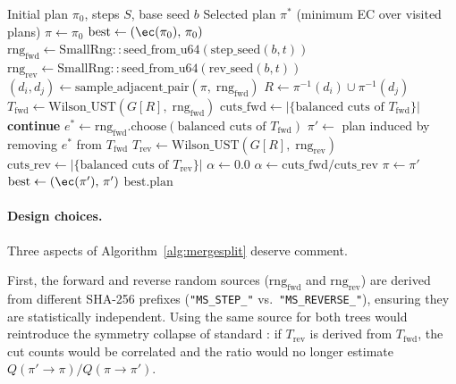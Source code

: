 \begin{algorithm}
\caption{\mergesplit{} Chain}
\label{alg:mergesplit}
\begin{algorithmic}[1]
\Require Initial plan $\pi_0$, steps $S$, base seed $b$
\Ensure  Selected plan $\pi^*$ (minimum EC over visited plans)
\State $\pi \gets \pi_0$
\State $\mathrm{best} \gets (\ec(\pi_0),\, \pi_0)$
  \State $\mathrm{rng}_{\mathrm{fwd}} \gets \mathrm{SmallRng::seed\_from\_u64}(\mathrm{step\_seed}(b, t))$
  \State $\mathrm{rng}_{\mathrm{rev}} \gets \mathrm{SmallRng::seed\_from\_u64}(\mathrm{rev\_seed}(b, t))$
  \State $(d_i, d_j) \gets \mathrm{sample\_adjacent\_pair}(\pi,\; \mathrm{rng}_{\mathrm{fwd}})$
  \State $R \gets \pi^{-1}(d_i) \cup \pi^{-1}(d_j)$
  \State $T_{\mathrm{fwd}} \gets \mathrm{Wilson\_UST}(G[R],\; \mathrm{rng}_{\mathrm{fwd}})$
  \State $\mathrm{cuts\_fwd} \gets |\{\text{balanced cuts of } T_{\mathrm{fwd}}\}|$
   \textbf{continue} \EndIf
  \State $e^* \gets \mathrm{rng}_{\mathrm{fwd}}.\mathrm{choose}(\text{balanced cuts of } T_{\mathrm{fwd}})$
  \State $\pi' \gets$ plan induced by removing $e^*$ from $T_{\mathrm{fwd}}$
  \State $T_{\mathrm{rev}} \gets \mathrm{Wilson\_UST}(G[R],\; \mathrm{rng}_{\mathrm{rev}})$
  \State $\mathrm{cuts\_rev} \gets |\{\text{balanced cuts of } T_{\mathrm{rev}}\}|$
    \State $\alpha \gets 0.0$
  \Else
    \State $\alpha \gets \mathrm{cuts\_fwd} / \mathrm{cuts\_rev}$
  \EndIf
    \State $\pi \gets \pi'$
      \State $\mathrm{best} \gets (\ec(\pi'),\, \pi')$
    \EndIf
  \EndIf
\EndFor
\State \Return $\mathrm{best.plan}$
\end{algorithmic}
\end{algorithm}

\paragraph{Design choices.}
Three aspects of Algorithm~\ref{alg:mergesplit} deserve comment.

First, the forward and reverse random sources ($\mathrm{rng}_{\mathrm{fwd}}$
and $\mathrm{rng}_{\mathrm{rev}}$) are derived from different SHA-256 prefixes
(\texttt{"MS\_STEP\_"} vs.\ \texttt{"MS\_REVERSE\_"}), ensuring they are
statistically independent.
Using the same source for both trees would reintroduce the symmetry collapse
of standard \recom{}: if $T_{\mathrm{rev}}$ is derived from $T_{\mathrm{fwd}}$,
the cut counts would be correlated and the ratio would no longer estimate
$Q(\pi' \!\to\! \pi) / Q(\pi \!\to\! \pi')$.

